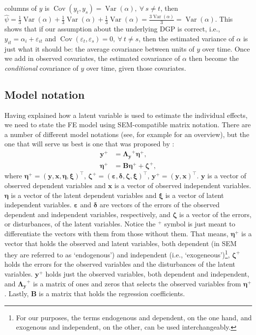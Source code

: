 \documentclass[]{interact}
\theoremstyle{plain}%
\theoremstyle{definition}
\theoremstyle{remark}
\begin{document}
columns of \(y\) is
\(\mathop{\mathrm{\mathrm{Cov}}}(y_{t},y_{s}) = \mathop{\mathrm{\mathrm{Var}}}(\alpha), \ \forall \ s \ne t\),
then
\(\hat{\psi} = \frac{1}{3}\mathop{\mathrm{\mathrm{Var}}}(\alpha) + \frac{1}{3}\mathop{\mathrm{\mathrm{Var}}}(\alpha) + \frac{1}{3}\mathop{\mathrm{\mathrm{Var}}}(\alpha) = \frac{3 \mathop{\mathrm{\mathrm{Var}}}(\alpha)}{3} = \mathop{\mathrm{\mathrm{Var}}}(\alpha)\).
This shows that if our assumption about the underlying DGP is correct,
i.e., \(y_{it} = \alpha_{i} + \varepsilon_{it}\) and
\(\mathop{\mathrm{\mathrm{Cov}}}(\varepsilon_{t},\varepsilon_{s}) = 0, \ \forall \ t \ne s\),
then the estimated variance of \(\alpha\) is just what it should be: the
average covariance between units of \(y\) over time. Once we add in
observed covariates, the estimated covariance of \(\alpha\) then become
the \textit{conditional} covariance of \(y\) over time, given those
covariates.

\hypertarget{model-notation}{%
\subsection{Model notation}\label{model-notation}}

Having explained how a latent variable is used to estimate the
individual effects, we need to state the FE model using SEM-compatible
matrix notation. There are a number of different model notations (see,
for example \citet{Bollen1989} for an overview), but the one that will
serve us best is one that was proposed by \citet{Graff1979}:
\begin{align}
\bm{y}^{+} & = \bm{\Lambda_{y}}^{+} \bm{\eta}^{+}, \\
\bm{\eta}^{+} & = \bm{B}\bm{\eta}^{+} + \bm{\zeta}^{+}, 
\end{align} where
\(\bm{\eta}^{+} = (\bm{y}, \bm{x}, \bm{\eta}, \bm{\xi})^{\intercal}\),
\(\bm{\zeta}^{+} = (\bm{\varepsilon}, \bm{\delta}, \bm{\zeta}, \bm{\xi})^{\intercal}\),
\(\bm{y}^{+} = (\bm{y}, \bm{x})^{\intercal}\). \(\bm{y}\) is a vector of
observed dependent variables and \(\bm{x}\) is a vector of observed
independent variables. \(\bm{\eta}\) is a vector of the latent dependent
variables and \(\bm{\xi}\) is a vector of latent independent variables.
\(\bm{\varepsilon}\) and \(\bm{\delta}\) are vectors of the errors of
the observed dependent and independent variables, respectively, and
\(\bm{\zeta}\) is a vector of the errors, or disturbances, of the latent
variables. Notice the \(^{+}\) symbol is just meant to differentiate the
vectors with them from those without them. That means, \(\bm{\eta}^{+}\)
is a vector that holds the observed and latent variables, both dependent
(in SEM they are referred to as `endogenous') and independent (i.e.,
`exogeneous')\footnote{For our purposes, the terms endogenous and
  dependent, on the one hand, and exogenous and independent, on the
  other, can be used interchangeably.}, \(\bm{\zeta}^{+}\) holds the
errors for the observed variables and the disturbances of the latent
variables. \(\bm{y}^{+}\) holds just the observed variables, both
dependent and independent, and \(\bm{\Lambda_{y}}^{+}\) is a matrix of
ones and zeros that selects the observed variables from
\(\bm{\eta}^{+}\). Lastly, \(\bm{B}\) is a matrix that holds the
regression coefficients.
\end{document}
